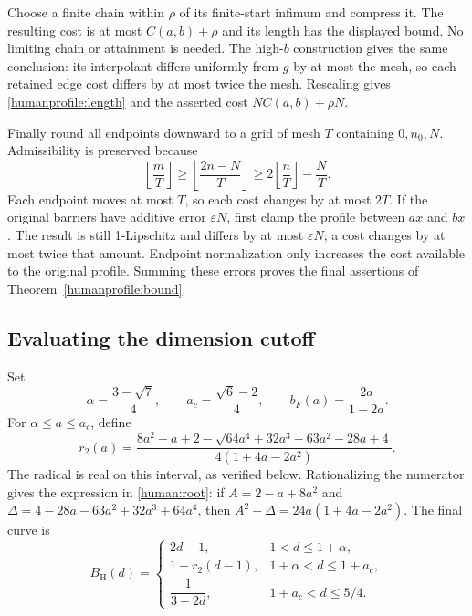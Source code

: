 Choose a finite chain within \(\rho\) of its finite-start infimum
and compress it. The resulting cost is at most \(C(a,b)+\rho\)
and its length has the displayed bound. No limiting chain or attainment
is needed. The high-\(b\) construction gives the same conclusion:
its interpolant differs uniformly from \(g\) by at most the mesh,
so each retained edge cost differs by at most twice the mesh.
Rescaling gives \eqref{humanprofile:length} and the asserted
cost \(NC(a,b)+\rho N\).

Finally round all endpoints downward to a grid of mesh \(T\) containing
\(0,n_0,N\). Admissibility is preserved because
\[
 \left\lfloor\frac mT\right\rfloor
 \ge\left\lfloor\frac{2n-N}{T}\right\rfloor
 \ge2\left\lfloor\frac nT\right\rfloor-\frac NT .
\]
Each endpoint moves at most \(T\), so each cost changes by at most
\(2T\). If the original barriers have additive error
\(\varepsilon N\), first clamp the profile between \(ax\) and \(bx\).
The result is still 1-Lipschitz and differs by at most
\(\varepsilon N\); a cost changes by at most twice that amount.
Endpoint normalization only increases the cost available to the original
profile. Summing these errors proves the final assertions of
Theorem~\ref{humanprofile:bound}.

\subsection{Evaluating the dimension cutoff}

Set
\[
 \alpha=\frac{3-\sqrt7}{4},\qquad
 a_c=\frac{\sqrt6-2}{4},\qquad
 b_F(a)=\frac{2a}{1-2a}.
\]
For \(\alpha\le a\le a_c\), define
\begin{equation}\label{humanprofile:root}
 r_2(a)=
 \frac{8a^2-a+2-
 \sqrt{64a^4+32a^3-63a^2-28a+4}}
 {4(1+4a-2a^2)}.
\end{equation}
The radical is real on this interval, as verified below. Rationalizing the
numerator gives the expression in \eqref{human:root}: if
\(A=2-a+8a^2\) and \(\Delta=4-28a-63a^2+32a^3+64a^4\), then
\(A^2-\Delta=24a(1+4a-2a^2)\).
The final curve is
\begin{equation}\label{humanprofile:curve}
 B_{\mathrm H}(d)=
 \begin{cases}
  2d-1,&1<d\le1+\alpha,\\[2pt]
  1+r_2(d-1),&1+\alpha<d\le1+a_c,\\[2pt]
  \dfrac1{3-2d},&1+a_c<d\le5/4.
 \end{cases}
\end{equation}

